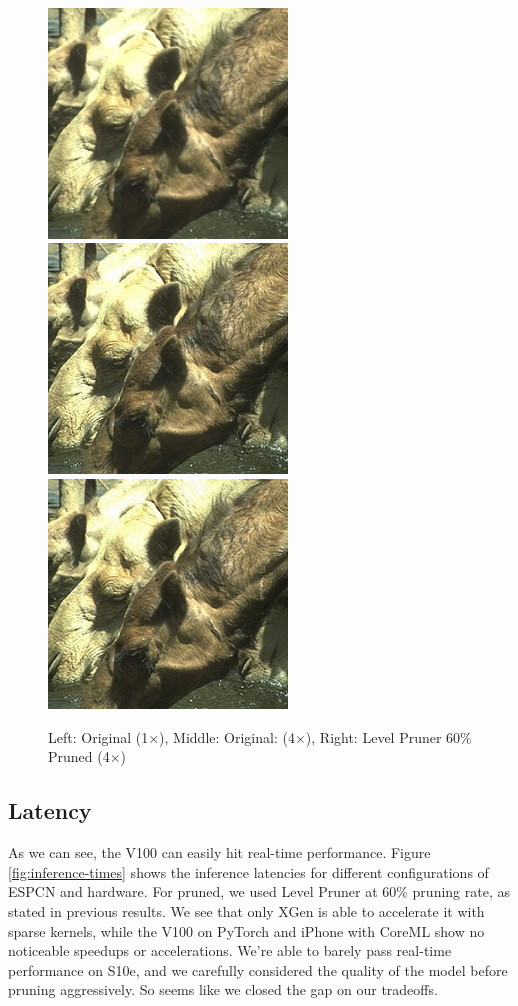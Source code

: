 \documentclass{article}
\begin{document}
\begin{figure}
	\centerline{\includegraphics[width=2.5in]{../final/figures/original_zoomed.png}\includegraphics[width=2.5in]{../final/figures/original4_zoomed.png}\includegraphics[width=2.5in]{../final/figures/levelpruner_zoomed.png}}
	\caption{Left: Original (1$\times$), Middle: Original: (4$\times$), Right: Level Pruner 60\% Pruned (4$\times$)}
	\label{fig:final-pruned-zoomed}
\end{figure}


\subsection{Latency}

As we can see, the V100 can easily hit real-time performance.
Figure \ref{fig:inference-times} shows the inference latencies for different configurations of ESPCN and hardware. For pruned, we used Level Pruner at 60\% pruning rate, as stated in previous results. We see that only XGen is able to accelerate it with sparse kernels, while the V100 on PyTorch and iPhone with CoreML show no noticeable speedups or accelerations. We're able to barely pass real-time performance on S10e, and we carefully considered the quality of the model before pruning aggressively. So seems like we closed the gap on our tradeoffs.
\end{document}
